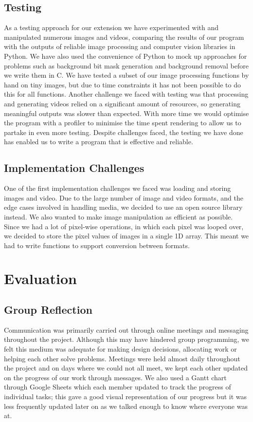 \documentclass[11pt]{article}
\begin{document}
  \subsection*{Testing}
As a testing approach for our extension we have experimented with and manipulated numerous images and videos, comparing the results of our program with the outputs of reliable image processing and computer vision libraries in Python. We have also used the convenience of Python to mock up approaches for problems such as background bit mask generation and background removal before we write them in C. We have tested a subset of our image processing functions by hand on tiny images, but due to time constraints it has not been possible to do this for all functions. Another challenge we faced with testing was that processing and generating videos relied on a significant amount of resources, so generating meaningful outputs was slower than expected. With more time we would optimise the program with a profiler to minimise the time spent rendering to allow us to partake in even more testing.  Despite challenges faced, the testing we have done has enabled us to write a program that is effective and reliable.

  \subsection*{Implementation Challenges}
  One of the first implementation challenges we faced was loading and storing images and video. Due to the large number of image and video formats, and the edge cases involved in handling media, we decided to use an open source library instead. We also wanted to make image manipulation as efficient as possible. Since we had a lot of pixel-wise operations, in which each pixel was looped over, we decided to store the pixel values of images in a single 1D array. This meant we had to write functions to support conversion between formats.

  \section*{Evaluation}

  \subsection*{Group Reflection}

Communication was primarily carried out through online meetings and messaging throughout the project. Although this may have hindered group programming, we felt this medium was adequate for making design decisions, allocating work or helping each other solve problems. Meetings were held almost daily throughout the project and on days where we could not all meet, we kept each other updated on the progress of our work through messages. We also used a Gantt chart through Google Sheets which each member updated to track the progress of individual tasks; this gave a good visual representation of our progress but it was less frequently updated later on as we talked enough to know where everyone was at.
\end{document}
